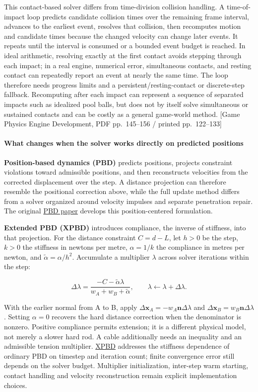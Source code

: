 This contact-based solver differs from time-division collision handling. A time-of-impact loop predicts candidate collision times over the remaining frame interval, advances to the earliest event, resolves that collision, then recomputes motion and candidate times because the changed velocity can change later events. It repeats until the interval is consumed or a bounded event budget is reached. In ideal arithmetic, resolving exactly at the first contact avoids stepping through each impact; in a real engine, numerical error, simultaneous contacts, and resting contact can repeatedly report an event at nearly the same time. The loop therefore needs progress limits and a persistent/resting-contact or discrete-step fallback. Recomputing after each impact can represent a sequence of separated impacts such as idealized pool balls, but does not by itself solve simultaneous or sustained contacts and can be costly as a general game-world method. {[}Game Physics Engine Development, PDF pp.~145--156 / printed pp.~122--133{]}

\paragraph{What changes when the solver works directly on predicted positions}\label{what-changes-when-the-solver-works-directly-on-predicted-positions}

\textbf{Position-based dynamics (PBD)} predicts positions, projects constraint violations toward admissible positions, and then reconstructs velocities from the corrected displacement over the step. A distance projection can therefore resemble the positional correction above, while the full update method differs from a solver organized around velocity impulses and separate penetration repair. The original \href{https://doi.org/10.2312/PE/vriphys/vriphys06/071-080}{PBD paper} develops this position-centered formulation.

\textbf{Extended PBD (XPBD)} introduces compliance, the inverse of stiffness, into that projection. For the distance constraint \(C=d-L\), let \(h>0\) be the step, \(k>0\) the stiffness in newtons per metre, \(\alpha=1/k\) the compliance in metres per newton, and \(\widetilde\alpha=\alpha/h^2\). Accumulate a multiplier \(\lambda\) across solver iterations within the step:

\[
\Delta\lambda=\frac{-C-\widetilde\alpha\lambda}{w_A+w_B+\widetilde\alpha},\qquad
\lambda\leftarrow\lambda+\Delta\lambda.
\]

With the earlier normal from A to B, apply \(\Delta\mathbf x_A=-w_A\mathbf n\Delta\lambda\) and \(\Delta\mathbf x_B=w_B\mathbf n\Delta\lambda\). Setting \(\alpha=0\) recovers the hard distance correction when the denominator is nonzero. Positive compliance permits extension; it is a different physical model, not merely a slower hard rod. A cable additionally needs an inequality and an admissible tension multiplier. \href{https://mmacklin.com/xpbd.pdf}{XPBD} addresses the stiffness dependence of ordinary PBD on timestep and iteration count; finite convergence error still depends on the solver budget. Multiplier initialization, inter-step warm starting, contact handling and velocity reconstruction remain explicit implementation choices.

